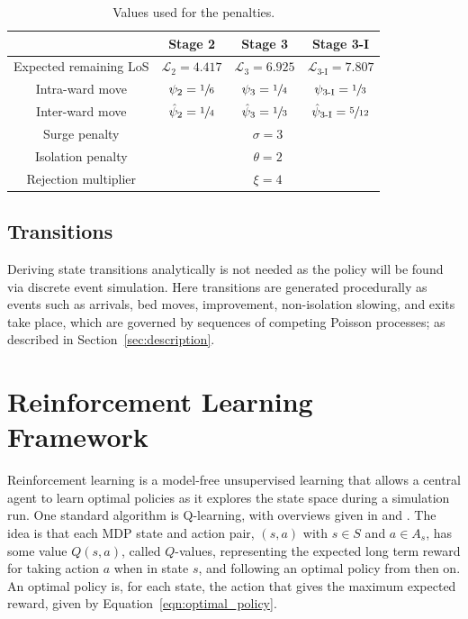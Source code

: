 \documentclass{article}
\begin{document}
\begin{table}
\begin{center}
\begin{tabular}{cccc}
\toprule
& Stage 2 & Stage 3 & Stage 3-I \\
\midrule
Expected remaining LoS & $\mathcal{L}_2 = 4.417$ & $\mathcal{L}_3 = 6.925$ & $\mathcal{L}_{3\text{-I}} = 7.807$ \\
Intra-ward move & $\psi_2 = \sfrac{1}{6}$ & $\psi_3 = \sfrac{1}{4}$ & $\psi_{3\text{-I}} = \sfrac{1}{3}$ \\
Inter-ward move & $\hat{\psi}_2 = \sfrac{1}{4}$ & $\hat{\psi}_3 = \sfrac{1}{3}$ & $\hat{\psi}_{3\text{-I}} = \sfrac{5}{12}$ \\
Surge penalty & \multicolumn{3}{c}{$\sigma = 3$} \\
Isolation penalty & \multicolumn{3}{c}{$\theta = 2$} \\
Rejection multiplier & \multicolumn{3}{c}{$\xi = 4$} \\
\bottomrule
\end{tabular}
\caption{Values used for the penalties.}
\label{tbl:penalties}
\end{center}
\end{table}


\subsection{Transitions}
Deriving state transitions analytically is not needed as the policy will be
found via discrete event simulation.
Here transitions are generated procedurally as events such as arrivals, bed
moves, improvement, non-isolation slowing, and exits take place, which are
governed by sequences of competing Poisson processes; as described in
Section~\ref{sec:description}.


\section{Reinforcement Learning Framework}\label{sec:rlframework}
Reinforcement learning is a model-free unsupervised learning that allows a
central agent to learn optimal policies as it explores the state space during a
simulation run.
One standard algorithm is Q-learning, with overviews given in
\cite{suttonbarto1998} and \cite{watkins1992}.
The idea is that each MDP state and action pair, $(s, a)$ with $s \in S$ and
$a \in A_s$, has some value $Q(s, a)$, called $Q$-values, representing the
expected long term reward for taking action $a$ when in state $s$, and
following an optimal policy from then on.
An optimal policy is, for each state, the action that gives the maximum
expected reward, given by Equation~\ref{eqn:optimal_policy}.
\end{document}
